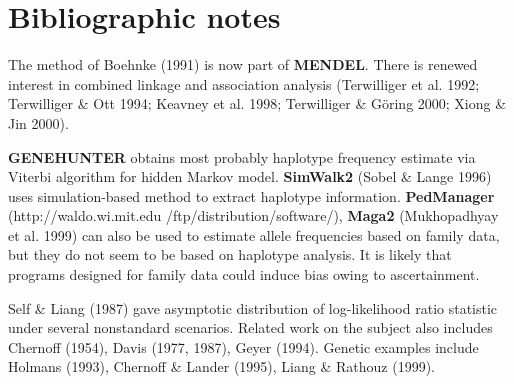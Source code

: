 \section{Bibliographic notes}

The method of Boehnke (1991) is now part of {\bf MENDEL}.  There is renewed
interest in combined linkage and association analysis (Terwilliger et al.
1992; Terwilliger \& Ott 1994; Keavney et al.  1998; Terwilliger \& G\"{o}ring
2000; Xiong \& Jin 2000).

{\bf GENEHUNTER} obtains most probably haplotype frequency estimate via Viterbi
algorithm for hidden Markov model.  {\bf SimWalk2} (Sobel \& Lange 1996) uses
simulation-based method to extract haplotype information.  {\bf PedManager}
(http://waldo.wi.mit.edu /ftp/distribution/software/), {\bf Maga2}
(Mukhopadhyay et al.  1999) can also be used to estimate allele frequencies
based on family data, but they do not seem to be based on haplotype analysis.
It is likely that programs designed for family data could induce bias owing to
ascertainment.

Self \& Liang (1987) gave asymptotic distribution of log-likelihood ratio
statistic under several nonstandard scenarios.  Related work on the subject
also includes Chernoff (1954), Davis (1977, 1987), Geyer (1994).  Genetic
examples include Holmans (1993), Chernoff \& Lander (1995), Liang \& Rathouz
(1999).
